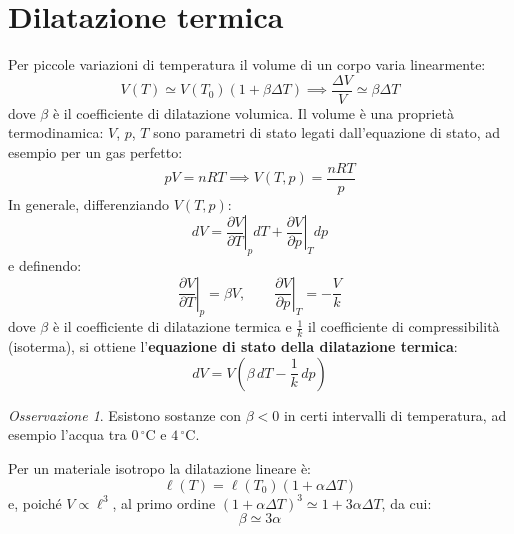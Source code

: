 \documentclass[11pt, a4paper, openright]{book}
\theoremstyle{plain}
\theoremstyle{definition}
\theoremstyle{remark}
\newtheorem{osservazione}[teorema]{Osservazione}
\begin{document}
\section{Dilatazione termica}
Per piccole variazioni di temperatura il volume di un corpo varia linearmente:
\begin{equation}
    V(T) \simeq V(T_0)\left(1 + \beta\Delta T\right) \implies \frac{\Delta V}{V} \simeq \beta\Delta T
\end{equation}
dove $\beta$ è il coefficiente di dilatazione volumica. Il volume è una proprietà termodinamica: $V$, $p$, $T$ sono parametri di stato legati dall'equazione di stato, ad esempio per un gas perfetto:
\begin{equation}
    pV = nRT \implies V(T, p) = \frac{nRT}{p}
\end{equation}
In generale, differenziando $V(T, p)$:
\begin{equation}
    dV = \left.\frac{\partial V}{\partial T}\right|_p dT + \left.\frac{\partial V}{\partial p}\right|_T dp
\end{equation}
e definendo:
\begin{equation}
    \left.\frac{\partial V}{\partial T}\right|_p = \beta V, \qquad \left.\frac{\partial V}{\partial p}\right|_T = -\frac{V}{k}
\end{equation}
dove $\beta$ è il coefficiente di dilatazione termica e $\frac{1}{k}$ il coefficiente di compressibilità (isoterma), si ottiene l'\textbf{equazione di stato della dilatazione termica}:
\begin{equation}
    dV = V\left(\beta\, dT - \frac{1}{k}\, dp\right)
\end{equation}
\begin{osservazione}
    Esistono sostanze con $\beta < 0$ in certi intervalli di temperatura, ad esempio l'acqua tra $0\,^\circ\text{C}$ e $4\,^\circ\text{C}$.
\end{osservazione}

Per un materiale isotropo la dilatazione lineare è:
\begin{equation}
    \ell(T) = \ell(T_0)\left(1 + \alpha\Delta T\right)
\end{equation}
e, poiché $V \propto \ell^3$, al primo ordine $(1 + \alpha\Delta T)^3 \simeq 1 + 3\alpha\Delta T$, da cui:
\begin{equation}
    \beta \simeq 3\alpha
\end{equation}
\end{document}

